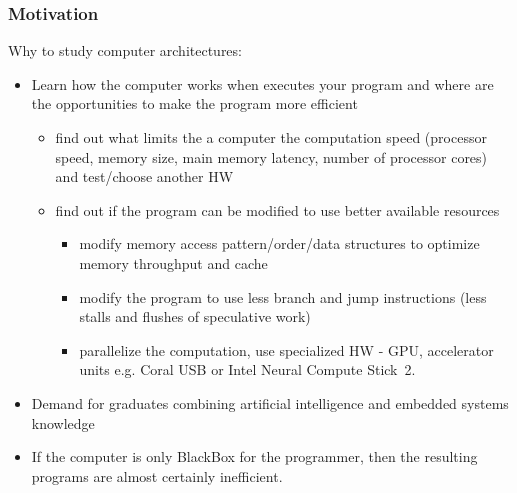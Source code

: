 \documentclass{beamer}
\begin{document}
\begin{frame}
\frametitle{Motivation}
Why to study computer architectures:
\begin{itemize}
\item Learn how the computer works when executes your program and where are the opportunities to make the program more efficient
  \begin{itemize}
  \item find out what limits the a computer the computation speed (processor speed, memory size, main memory latency, number of processor cores) and test/choose another HW
  \item find out if the program can be modified to use better available resources
  \begin{itemize}
    \item modify memory access pattern/order/data structures to optimize memory throughput and cache
    \item modify the program to use less branch and jump instructions (less stalls and flushes of speculative work)
    \item parallelize the computation, use specialized HW - GPU, accelerator units e.g. Coral USB or Intel Neural Compute Stick~2.
  \end{itemize}
\end{itemize}
\item Demand for graduates combining artificial intelligence and embedded systems knowledge
\item If the computer is only BlackBox for the programmer, then the resulting programs are almost certainly inefficient.
\end{itemize}
\end{frame}
\end{document}
